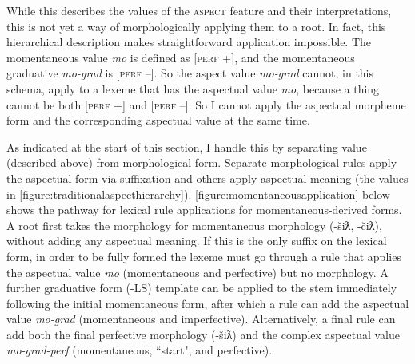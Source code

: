 \begin{figure}[H]
\begin{footnotesize}
\end{footnotesize}
\end{figure}


While this describes the values of the \textsc{aspect} feature and their interpretations, this is not yet a way of morphologically applying them to a root. In fact, this hierarchical description makes straightforward application impossible. The momentaneous value \textit{mo} is defined as [\textsc{perf} +], and the momentaneous graduative \textit{mo-grad} is [\textsc{perf} --]. So the aspect value \textit{mo-grad} cannot, in this schema, apply to a lexeme that has the aspectual value \textit{mo}, because a thing cannot be both [\textsc{perf} +] and [\textsc{perf} --]. So I cannot apply the aspectual morpheme form and the corresponding aspectual value at the same time.

As indicated at the start of this section, I handle this by separating value (described above) from morphological form. Separate morphological rules apply the aspectual form via suffixation and others apply aspectual meaning (the values in \cref{figure:traditionalaspecthierarchy}). \cref{figure:momentaneousapplication} below shows the pathway for lexical rule applications for momentaneous-derived forms. A root first takes the morphology for momentaneous morphology (-šiƛ, -čiƛ), without adding any aspectual meaning. If this is the only suffix on the lexical form, in order to be fully formed the lexeme must go through a rule that applies the aspectual value \textit{mo} (momentaneous and perfective) but no morphology. A further graduative form (-LS) template can be applied to the stem immediately following the initial momentaneous form, after which a rule can add the aspectual value \textit{mo-grad} (momentaneous and imperfective). Alternatively, a final rule can add both the final perfective morphology (-šiƛ) and the complex aspectual value \textit{mo-grad-perf} (momentaneous, ``start", and perfective).

